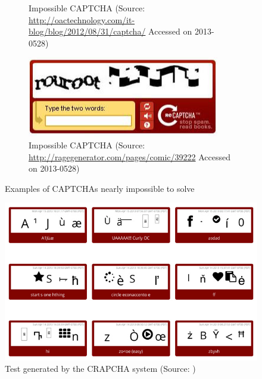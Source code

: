 \documentclass[pdftex,a4paper,12pt,twoside]{report}
\theoremstyle{plain} \newtheorem{theorem}{Theorem} \newtheorem{proposition}{Proposition} \newtheorem{lemma}{Lemma} \newtheorem*{corollary}{Corollary}
\theoremstyle{definition} \newtheorem{definition}{Definition} \newtheorem{conjecture}{Conjecture} \newtheorem*{example}{Example} \newtheorem{algorithm}{Algorithm}
\theoremstyle{remark} \newtheorem*{remark}{Remark} \newtheorem*{note}{Note} \newtheorem{case}{Case}
\begin{document}
\begin{figure}
\begin{subfigure}[b]{0.65\textwidth}
		\caption{Impossible CAPTCHA (Source: \url{http://oactechnology.com/it-blog/blog/2012/08/31/captcha/} Accessed on 2013-0528)}
	\end{subfigure}
	\begin{subfigure}[b]{0.65\textwidth}
		\centering
		\includegraphics[width=\textwidth]{./img/impossible_captcha04.png}
		\caption{Impossible CAPTCHA (Source: \url{http://ragegenerator.com/pages/comic/39222} Accessed on 2013-0528)}
	\end{subfigure}
	\caption{Examples of CAPTCHAs nearly impossible to solve}
	\label{fig:ImpossibleCaptcha}
\end{figure}
\begin{figure}
	\centering
	\includegraphics[width=\textwidth]{./img/CRAPCHA.png}
	\caption{Test generated by the CRAPCHA system (Source: \citep{Lsquid2013})}
	\label{fig:CRAPCHA}
\end{figure}
\end{document}
